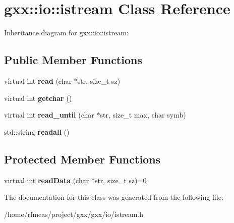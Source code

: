\hypertarget{classgxx_1_1io_1_1istream}{}\section{gxx\+:\+:io\+:\+:istream Class Reference}
\label{classgxx_1_1io_1_1istream}


Inheritance diagram for gxx\+:\+:io\+:\+:istream\+:
\subsection*{Public Member Functions}
\begin{DoxyCompactItemize}
\item 
virtual int {\bfseries read} (char $\ast$str, size\+\_\+t sz)\hypertarget{classgxx_1_1io_1_1istream_aaba879181cf83f2a8d6859eb703ce275}{}\label{classgxx_1_1io_1_1istream_aaba879181cf83f2a8d6859eb703ce275}

\item 
virtual int {\bfseries getchar} ()\hypertarget{classgxx_1_1io_1_1istream_ac6c3221181592d16ccb55b9846c00d6c}{}\label{classgxx_1_1io_1_1istream_ac6c3221181592d16ccb55b9846c00d6c}

\item 
virtual int {\bfseries read\+\_\+until} (char $\ast$str, size\+\_\+t max, char symb)\hypertarget{classgxx_1_1io_1_1istream_af1bf4b6e784d4c02091caef3151434cf}{}\label{classgxx_1_1io_1_1istream_af1bf4b6e784d4c02091caef3151434cf}

\item 
std\+::string {\bfseries readall} ()\hypertarget{classgxx_1_1io_1_1istream_a79298810ba40ce07e4e1e73085d4d922}{}\label{classgxx_1_1io_1_1istream_a79298810ba40ce07e4e1e73085d4d922}

\end{DoxyCompactItemize}
\subsection*{Protected Member Functions}
\begin{DoxyCompactItemize}
\item 
virtual int {\bfseries read\+Data} (char $\ast$str, size\+\_\+t sz)=0\hypertarget{classgxx_1_1io_1_1istream_a1cfa288b174b358ac4ee515c77f6efc4}{}\label{classgxx_1_1io_1_1istream_a1cfa288b174b358ac4ee515c77f6efc4}

\end{DoxyCompactItemize}


The documentation for this class was generated from the following file\+:\begin{DoxyCompactItemize}
\item 
/home/rfmeas/project/gxx/gxx/io/istream.\+h\end{DoxyCompactItemize}
